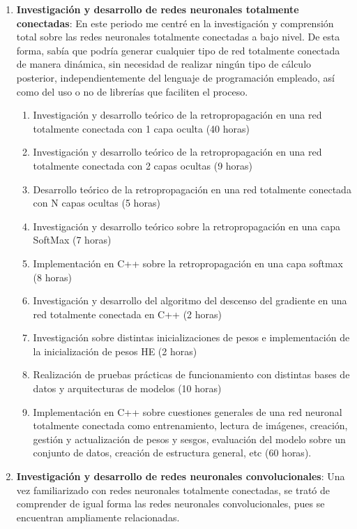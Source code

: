 \begin{enumerate}[label=\textbullet]
	\item \textbf{Investigación y desarrollo de redes neuronales totalmente conectadas}: En este periodo me centré en la investigación y comprensión total sobre las redes neuronales totalmente conectadas a bajo nivel. De esta forma, sabía que podría generar cualquier tipo de red totalmente conectada de manera dinámica, sin necesidad de realizar ningún tipo de cálculo posterior, independientemente del lenguaje de programación empleado, así como del uso o no de librerías que faciliten el proceso. 
	\begin{enumerate}[label=\textbullet]
		\item Investigación y desarrollo teórico de la retropropagación en una red totalmente conectada con 1 capa oculta (40 horas)
		\item Investigación y desarrollo teórico de la retropropagación en una red totalmente conectada con 2 capas ocultas (9 horas)
		\item Desarrollo teórico de la retropropagación en una red totalmente conectada con N capas ocultas (5 horas)
		\item Investigación y desarrollo teórico sobre la retropropagación en una capa SoftMax (7 horas)
		\item Implementación en C++ sobre la retropropagación en una capa softmax (8 horas)
		\item Investigación y desarrollo del algoritmo del descenso del gradiente en una red totalmente conectada en C++ (2 horas)
		\item Investigación sobre distintas inicializaciones de pesos e implementación de la inicialización de pesos HE (2 horas)	
		\item Realización de pruebas prácticas de funcionamiento con distintas bases de datos y arquitecturas de modelos (10 horas)	
		\item Implementación en C++ sobre cuestiones generales de una red neuronal totalmente conectada como entrenamiento, lectura de imágenes, creación, gestión y actualización de pesos y sesgos, evaluación del modelo sobre un conjunto de datos, creación de estructura general, etc (60 horas).
	\end{enumerate}
	\item \textbf{Investigación y desarrollo de redes neuronales convolucionales}:
	Una vez familiarizado con redes neuronales totalmente conectadas, se trató de comprender de igual forma las redes neuronales convolucionales, pues se encuentran ampliamente relacionadas.
	\begin{enumerate}[label=\textbullet]

\end{enumerate}
\end{enumerate}
